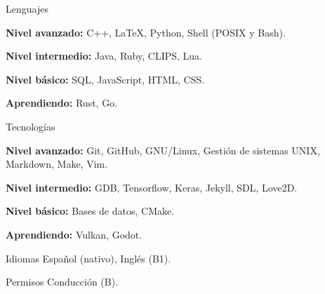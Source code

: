 
\begin{cvskills}

\cvskill%
	{Lenguajes} %
	{
	\begin{cvitems}
		\item \textbf{Nivel avanzado:} C++, LaTeX, Python, Shell (POSIX y Bash).
		\item \textbf{Nivel intermedio:} Java, Ruby, CLIPS, Lua.
		\item \textbf{Nivel básico:} SQL, JavaScript, HTML, CSS.
		\item \textbf{Aprendiendo:} Rust, Go.
	\end{cvitems}
	} %

\cvskill%
	{Tecnologías}
	{
		\begin{cvitems}
			\item \textbf{Nivel avanzado:} Git, GitHub, GNU/Linux, Gestión de sistemas UNIX, Markdown, Make, Vim.
			\item \textbf{Nivel intermedio:} GDB, Tensorflow, Keras, Jekyll, SDL, Love2D.
			\item \textbf{Nivel básico:} Bases de datos, CMake.
			\item \textbf{Aprendiendo:} Vulkan, Godot.
		\end{cvitems}
	 }

\cvskill%
	{Idiomas}
	{Español (nativo), Inglés (B1).}

\cvskill%
	{Permisos}
	{Conducción (B).}

\end{cvskills}
